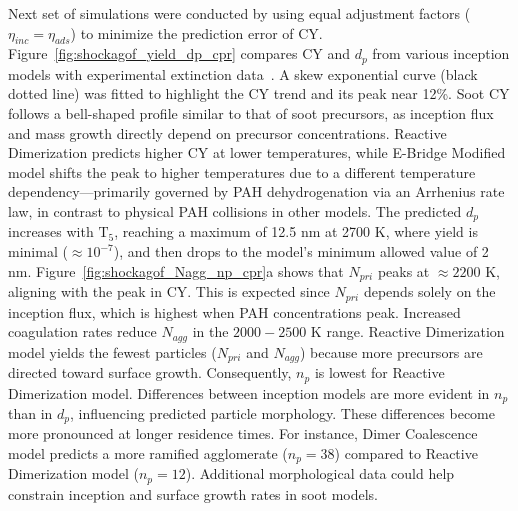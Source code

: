 Next set of simulations were conducted by using equal adjustment factors ($\eta_{inc}=\eta_{ads}$) to minimize the prediction error of CY. Figure~\ref{fig:shockagof_yield_dp_cpr} compares CY and $d_p$ from various inception models with experimental extinction data~\citep{agafonov2016unified}. A skew exponential curve (black dotted line) was fitted to highlight the CY trend and its peak near 12\%. Soot CY follows a bell-shaped profile similar to that of soot precursors, as inception flux and mass growth directly depend on precursor concentrations. Reactive Dimerization predicts higher CY at lower temperatures, while E-Bridge Modified model shifts the peak to higher temperatures due to a different temperature dependency—primarily governed by PAH dehydrogenation via an Arrhenius rate law, in contrast to physical PAH collisions in other models. The predicted $d_p$ increases with $\mathrm{T_5}$, reaching a maximum of 12.5 nm at 2700 K, where yield is minimal ($\approx 10^{-7}$), and then drops to the model's minimum allowed value of 2 nm. Figure~\ref{fig:shockagof_Nagg_np_cpr}a shows that $N_{pri}$ peaks at $\approx 2200$ K, aligning with the peak in CY. This is expected since $N_{pri}$ depends solely on the inception flux, which is highest when PAH concentrations peak. Increased coagulation rates reduce $N_{agg}$ in the $2000-2500$ K range.%
Reactive Dimerization model yields the fewest particles ($N_{pri}$ and $N_{agg}$) because more precursors are directed toward surface growth. Consequently, $n_p$ is lowest for Reactive Dimerization model. Differences between inception models are more evident in $n_p$ than in $d_p$, influencing predicted particle morphology. These differences become more pronounced at longer residence times. For instance, Dimer Coalescence model predicts a more ramified agglomerate ($n_p = 38$) compared to Reactive Dimerization model ($n_p = 12$). Additional morphological data could help constrain inception and surface growth rates in soot models.

